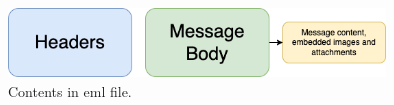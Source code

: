 \begin{figure}[H]
  \center
    \includegraphics[width=10cm]{figs/eml_contents.png}
    \caption{Contents in \ac{eml} file.}
    \label{fig:c2:eml_contents}
  \end{figure}